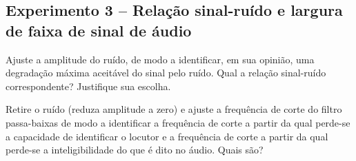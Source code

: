 \documentclass[12pt,addpoints]{exam}
\begin{document}
\subsection*{Experimento 3 -- Relação sinal-ruído e largura de faixa de sinal de áudio}

\begin{questions}
    \question Ajuste a amplitude do ruído, de modo a identificar, em sua opinião, uma degradação máxima aceitável do sinal pelo ruído. Qual a relação sinal-ruído correspondente? Justifique sua escolha.
    \fillwithlines{0.75in}
    
    \question Retire o ruído (reduza amplitude a zero) e ajuste a frequência de corte do filtro passa-baixas de modo a identificar a frequência de corte a partir da qual perde-se a capacidade de identificar o locutor e a frequência de corte a partir da qual perde-se a inteligibilidade do que é dito no áudio. Quais são?
    \fillwithlines{0.5in}
\end{questions}
\end{document}
